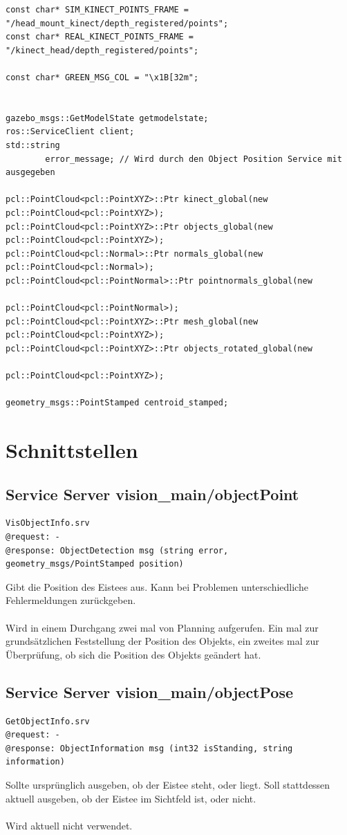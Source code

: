 \documentclass{suturo}
\begin{document}
\begin{verbatim}
const char* SIM_KINECT_POINTS_FRAME = "/head_mount_kinect/depth_registered/points";
const char* REAL_KINECT_POINTS_FRAME = "/kinect_head/depth_registered/points";

const char* GREEN_MSG_COL = "\x1B[32m";


gazebo_msgs::GetModelState getmodelstate;
ros::ServiceClient client;
std::string
        error_message; // Wird durch den Object Position Service mit ausgegeben

pcl::PointCloud<pcl::PointXYZ>::Ptr kinect_global(new pcl::PointCloud<pcl::PointXYZ>);
pcl::PointCloud<pcl::PointXYZ>::Ptr objects_global(new pcl::PointCloud<pcl::PointXYZ>);
pcl::PointCloud<pcl::Normal>::Ptr normals_global(new pcl::PointCloud<pcl::Normal>);
pcl::PointCloud<pcl::PointNormal>::Ptr pointnormals_global(new
												pcl::PointCloud<pcl::PointNormal>);
pcl::PointCloud<pcl::PointXYZ>::Ptr mesh_global(new pcl::PointCloud<pcl::PointXYZ>);
pcl::PointCloud<pcl::PointXYZ>::Ptr objects_rotated_global(new 	
											 	pcl::PointCloud<pcl::PointXYZ>);

geometry_msgs::PointStamped centroid_stamped;
\end{verbatim}


\section*{Schnittstellen}

\subsection*{Service Server vision\_main/objectPoint}
\begin{verbatim}
VisObjectInfo.srv
@request: -
@response: ObjectDetection msg (string error, geometry_msgs/PointStamped position)
\end{verbatim}
Gibt die Position des Eistees aus. Kann bei Problemen unterschiedliche Fehlermeldungen zurückgeben.
\\ \\
Wird in einem Durchgang zwei mal von Planning aufgerufen. Ein mal zur grundsätzlichen Feststellung der Position des Objekts, ein zweites mal zur Überprüfung, ob sich die Position des Objekts geändert hat.

\subsection*{Service Server vision\_main/objectPose}
\begin{verbatim}
GetObjectInfo.srv
@request: -
@response: ObjectInformation msg (int32 isStanding, string information)
\end{verbatim}
Sollte ursprünglich ausgeben, ob der Eistee steht, oder liegt. Soll stattdessen aktuell ausgeben, ob der Eistee im Sichtfeld ist, oder nicht.
\\ \\
Wird aktuell nicht verwendet.
\end{document}
